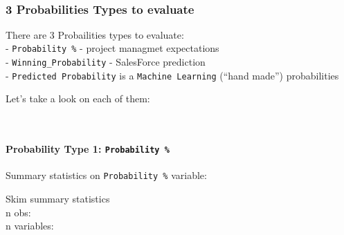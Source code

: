 \documentclass[]{article}
\newenvironment{Shaded}{\begin{snugshade}}{\end{snugshade}}
\newcommand{\DataTypeTok}[1]{\textcolor[rgb]{0.13,0.29,0.53}{#1}}
\newcommand{\KeywordTok}[1]{\textcolor[rgb]{0.13,0.29,0.53}{\textbf{#1}}}
\newcommand{\NormalTok}[1]{#1}
\newcommand{\OperatorTok}[1]{\textcolor[rgb]{0.81,0.36,0.00}{\textbf{#1}}}
\newcommand{\StringTok}[1]{\textcolor[rgb]{0.31,0.60,0.02}{#1}}
\let\oldparagraph\paragraph
\renewcommand{\paragraph}[1]{\oldparagraph{#1}\mbox{}}
\begin{document}
\normalsize

~

\hypertarget{probabilities-types-to-evaluate}{%
\subsubsection{3 Probabilities Types to
evaluate}\label{probabilities-types-to-evaluate}}

There are 3 Probailities types to evaluate:\\
- \texttt{Probability\ \%} - project managmet expectations\\
- \texttt{Winning\_Probability} - SalesForce prediction\\
- \texttt{Predicted\ Probability} is a \texttt{Machine\ Learning}
(``hand made'') probabilities

Let's take a look on each of them:

~

\hypertarget{probability-type-1-probability}{%
\paragraph{\texorpdfstring{Probability Type 1:
\texttt{Probability\ \%}}{Probability Type 1: Probability \%}}\label{probability-type-1-probability}}

Summary statistics on \texttt{Probability\ \%} variable:

\begin{Shaded}
\end{Shaded}

Skim summary statistics\\
n obs:\\
n variables:
\end{document}

